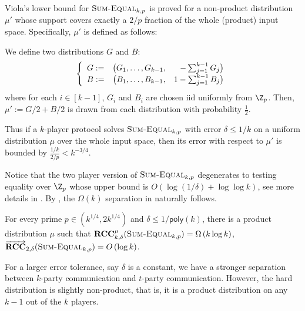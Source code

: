 \documentclass{toc}
\newcommand{\poly}{\mathsf{poly}}
\newcommand{\error}{\ensuremath{\delta}}
\newcommand{\bigo}[1]{\ensuremath{{{O} \left( {#1} \right)}}}
\newcommand{\bigomega}[1]{\ensuremath{{\Omega \left( {#1} \right)}}}
\newcommand{\eqdef}{\ensuremath{:=}}
\newcommand{\rcc}{\ensuremath{\mathbf{RCC}}}
\newcommand{\rccone}{\ensuremath{\overrightarrow{\mathbf{RCC}}}}
\newcommand{\sumequal}{\textsc{Sum-Equal} }
\begin{document}
\begin{remark}
\label{remark:Viola}
Viola's lower bound for $\sumequal_{k,p}$ is proved for a non-product distribution $\mu'$ whose support covers exactly a $2/p$ fraction of the whole (product) input  space. Specifically, $\mu'$ is defined as follows:
\begin{definition}
\label{def:Viola_Distribution}
We define two distributions $G$ and $B$:
		\[
			\left\{
			\begin{array}{c c r}
				G \eqdef &	\big( G_1,\dots, G_{k-1} , &-\sum_{j=1}^{k-1} G_j \big)		\\
				B \eqdef &  \big( B_1,\dots, B_{k-1} , &1-\sum_{j=1}^{k-1} B_j \big)
			\end{array}		
			\right.
		\]
%
where for each $i \in [k-1]$, $G_i$ and $B_i$ are chosen iid uniformly from $\Z_p$. Then, $\mu' \eqdef G/2 + B/2$ is drawn from each distribution with probability $\frac{1}{2}$.
\end{definition}
Thus if a $k$-player protocol solves $\sumequal_{k,p}$ with error $\error\le 1/k$ on a uniform distribution $\mu$ over the whole input space,
then its error with respect to $\mu'$ is bounded by $\frac{1/k}{2/p}< k^{-3/4}$.
\end{remark}
Notice that the two player version of $\sumequal_{k,p}$ degenerates to testing equality over $\Z_p$ whose upper bound is $\bigo{\log(1/\error)+\log\log k}$,
see more details in .
By , the $\bigomega{k}$ separation in  naturally follows.

\begin{corollary}\label{corollary:lower bound}
	For every prime $p\in(k^{1/4},2k^{1/4})$ and $\error\le 1/\poly(k)$, there is a product distribution $\mu$ such that $\rcc_{k,\error}^{\mu}(\sumequal_{k,p}) = \bigomega{k\log k}$,
	$\rccone_{2,\error}(\sumequal_{k,p}) = \bigo{\log k}$.
\end{corollary}


For a larger error tolerance, say $\error$ is a constant, we have a stronger separation between $k$-party communication and $t$-party communication. However, the hard distribution is slightly non-product, that is, it is a product distribution on any $k-1$ out of the $k$ players. 
\end{document}

